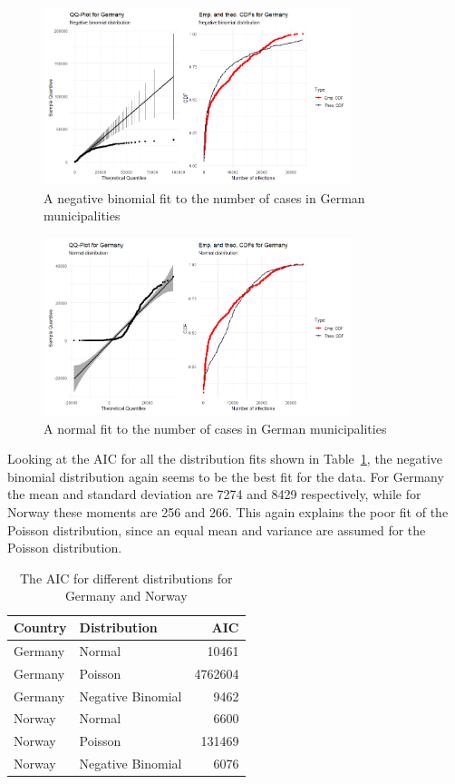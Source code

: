 \begin{figure}[H]
  \centering
  \includegraphics[width = 0.8\textwidth]{fit_nbinom_germany_ts.png}
  \caption{A negative binomial fit to the number of cases in German municipalities}
  \label{fitNegbinomGermany_ts}
\end{figure}
\begin{figure}[H]
  \centering
  \includegraphics[width = 0.8\textwidth]{fit_normal_germany_ts.png}
  \caption{A normal fit to the number of cases in German municipalities}
  \label{fitNormalGermany_ts}
\end{figure}
Looking at the AIC for all the distribution fits shown in Table~\ref{aic_temporal}, the negative binomial distribution again seems to be the best fit for the data. For Germany the mean and standard deviation are 7274 and 8429 respectively, while for Norway these moments are 256 and 266. This again explains the poor fit of the Poisson distribution, since an equal mean and variance are assumed for the Poisson distribution.
\begin{table}[H] 
\caption{The AIC for different distributions for Germany and Norway \label{aic_temporal}}
\begin{tabular}{l l r}
\toprule
\textbf{Country}	& \textbf{Distribution}	& \textbf{AIC} \\
\midrule
Germany & Normal & 10461 \\
Germany & Poisson & 4762604 \\
Germany & Negative Binomial & 9462 \\
Norway & Normal & 6600 \\
Norway & Poisson & 131469 \\
Norway & Negative Binomial & 6076 \\
\bottomrule
\end{tabular}
\end{table}
